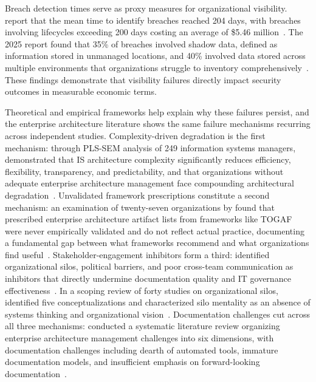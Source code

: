 Breach detection times serve as proxy measures for organizational visibility. \citeauthor{IBM_Ponemon_2024} report that the mean time to identify breaches reached 204 days, with breaches involving lifecycles exceeding 200 days costing an average of \$5.46 million~\parencite{IBM_Ponemon_2024}. The 2025 report found that 35\% of breaches involved shadow data, defined as information stored in unmanaged locations, and 40\% involved data stored across multiple environments that organizations struggle to inventory comprehensively~\parencite{IBM_Ponemon_2025}. These findings demonstrate that visibility failures directly impact security outcomes in measurable economic terms.

Theoretical and empirical frameworks help explain why these failures persist, and the enterprise architecture literature shows the same failure mechanisms recurring across independent studies. Complexity-driven degradation is the first mechanism: through PLS-SEM analysis of 249 information systems managers, \citeauthor{Beese_2023} demonstrated that IS architecture complexity significantly reduces efficiency, flexibility, transparency, and predictability, and that organizations without adequate enterprise architecture management face compounding architectural degradation~\parencite{Beese_2023}. Unvalidated framework prescriptions constitute a second mechanism: an examination of twenty-seven organizations by \citeauthor{Kotusev_2019} found that prescribed enterprise architecture artifact lists from frameworks like TOGAF were never empirically validated and do not reflect actual practice, documenting a fundamental gap between what frameworks recommend and what organizations find useful~\parencite{Kotusev_2019}. Stakeholder-engagement inhibitors form a third: \citeauthor{Kurnia_2021} identified organizational silos, political barriers, and poor cross-team communication as inhibitors that directly undermine documentation quality and IT governance effectiveness~\parencite{Kurnia_2021}. In a scoping review of forty studies on organizational silos, \citeauthor{Bento_Tagliabue_Lorenzo_2020} identified five conceptualizations and characterized silo mentality as an absence of systems thinking and organizational vision~\parencite{Bento_Tagliabue_Lorenzo_2020}. Documentation challenges cut across all three mechanisms: \citeauthor{Bree_Karger_2022} conducted a systematic literature review organizing enterprise architecture management challenges into six dimensions, with documentation challenges including dearth of automated tools, immature documentation models, and insufficient emphasis on forward-looking documentation~\parencite{Bree_Karger_2022}.

